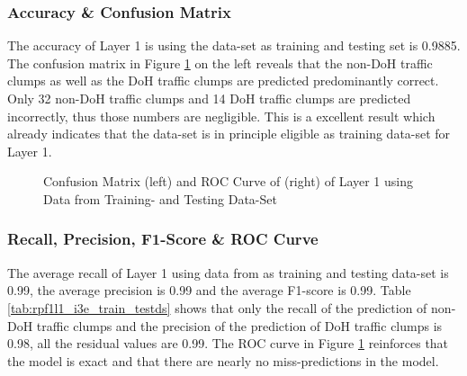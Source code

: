 \subsubsection{Accuracy \& Confusion Matrix}
The accuracy of Layer 1 is using the data-set \cite{ieee_dataset} as training and testing set is 0.9885. The confusion matrix in Figure \ref{fig:con_roc_l1_i3e_train_test} on the left reveals that the non-DoH traffic clumps as well as the DoH traffic clumps are predicted predominantly correct. Only 32 non-DoH traffic clumps and 14 DoH traffic clumps are predicted incorrectly, thus those numbers are negligible. This is a excellent result which already indicates that the data-set is in principle eligible as training data-set for Layer 1.

\begin{figure}[ht]
\centering
{}\hspace{1.0cm}
\caption{Confusion Matrix (left) and ROC Curve of (right) of Layer 1 using Data from \cite{ieee_dataset} Training- and Testing Data-Set}
\label{fig:con_roc_l1_i3e_train_test}
\end{figure}

\subsubsection{Recall, Precision, F1-Score \& ROC Curve}
The average recall of Layer 1 using data from \cite{ieee_dataset} as training and testing data-set is 0.99, the average precision is 0.99 and the average F1-score is 0.99. Table \ref{tab:rpf1l1_i3e_train_testds} shows that only the recall of the prediction of non-DoH traffic clumps and the precision of the prediction of DoH traffic clumps is 0.98, all the residual values are 0.99. The ROC curve in Figure \ref{fig:con_roc_l1_i3e_train_test} reinforces that the model is exact and that there are nearly no miss-predictions in the model.

